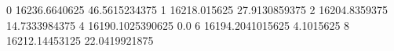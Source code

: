 0 16236.6640625 46.5615234375
1 16218.015625 27.9130859375
2 16204.8359375 14.7333984375
4 16190.1025390625 0.0
6 16194.2041015625 4.1015625
8 16212.14453125 22.0419921875

